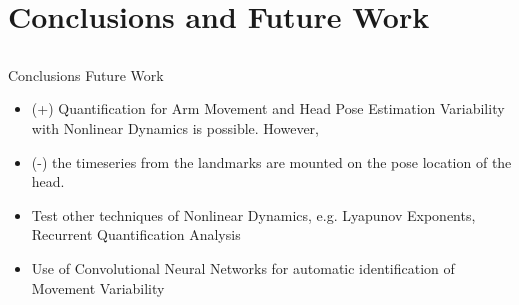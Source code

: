 

\section{Conclusions and Future Work}

\subsection{}
{
\begin{frame}{Conclusions Future Work}

\begin{itemize}
	\item (+) Quantification for Arm Movement and Head Pose Estimation Variability with Nonlinear Dynamics is possible. However,
	\item (-) the timeseries from the landmarks are mounted on the pose location of the head. 
\end{itemize}

\begin{itemize}
	\item Test other techniques of Nonlinear Dynamics, e.g. Lyapunov Exponents, Recurrent Quantification Analysis
	\item Use of Convolutional Neural Networks for automatic identification of Movement Variability
\end{itemize}



\end{frame}
}


